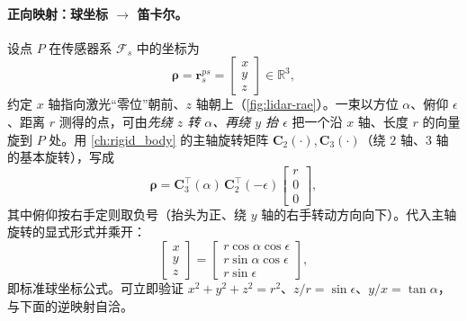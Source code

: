 \paragraph{正向映射：球坐标 $\to$ 笛卡尔。}
设点 $P$ 在传感器系 $\mathcal F_s$ 中的坐标为
\begin{equation}
  \boldsymbol\rho=\mathbf r_s^{ps}=\begin{bmatrix}x\\y\\z\end{bmatrix}\in\mathbb R^3,
  \label{eq:lidar-rae-rho}
\end{equation}
约定 $x$ 轴指向激光“零位”朝前、$z$ 轴朝上（\cref{fig:lidar-rae}）。一束以方位 $\alpha$、俯仰 $\epsilon$、距离 $r$ 测得的点，可由\emph{先绕 $z$ 转 $\alpha$、再绕 $y$ 抬 $\epsilon$} 把一个沿 $x$ 轴、长度 $r$ 的向量旋到 $P$ 处。用 \cref{ch:rigid_body} 的主轴旋转矩阵 $\mathbf C_2(\cdot),\mathbf C_3(\cdot)$（绕 $2$ 轴、$3$ 轴的基本旋转），写成
\begin{equation}
  \boldsymbol\rho=\mathbf C_3^\top(\alpha)\,\mathbf C_2^\top(-\epsilon)\begin{bmatrix}r\\0\\0\end{bmatrix},
  \label{eq:lidar-rae-fwd-rot}
\end{equation}
其中俯仰按右手定则取负号（抬头为正、绕 $y$ 轴的右手转动方向向下）。代入主轴旋转的显式形式并乘开：
\begin{equation}
  \begin{bmatrix}x\\y\\z\end{bmatrix}
  =\begin{bmatrix}
   r\cos\alpha\cos\epsilon\\
   r\sin\alpha\cos\epsilon\\
   r\sin\epsilon
  \end{bmatrix},
  \label{eq:lidar-rae-fwd}
\end{equation}
即标准球坐标公式。可立即验证 $x^2+y^2+z^2=r^2$、$z/r=\sin\epsilon$、$y/x=\tan\alpha$，与下面的逆映射自洽。

